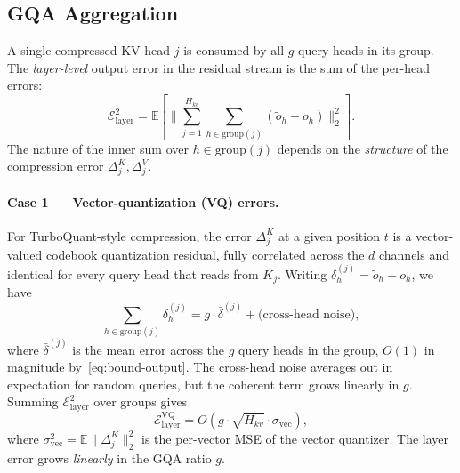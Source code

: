 \subsection{GQA Aggregation}
\label{sec:theory-gqa}

A single compressed KV head $j$ is consumed by all $g$ query heads in its
group. The \emph{layer-level} output error in the residual stream is the sum
of the per-head errors:
\begin{equation}
\label{eq:layer-error}
\mathcal{E}_{\mathrm{layer}}^2 = \mathbb{E}\!\left[ \Big\| \sum_{j=1}^{H_{kv}} \sum_{h \in \mathrm{group}(j)} (\tilde o_h - o_h) \Big\|_2^2 \right].
\end{equation}
The nature of the inner sum over $h \in \mathrm{group}(j)$ depends on the
\emph{structure} of the compression error $\Delta^K_j, \Delta^V_j$.

\paragraph{Case 1 — Vector-quantization (VQ) errors.}
For TurboQuant-style compression, the error $\Delta^K_j$ at a given position
$t$ is a vector-valued codebook quantization residual, fully correlated
across the $d$ channels and identical for every query head that reads from
$K_j$. Writing $\delta_h^{(j)} = \tilde o_h - o_h$, we have
\[
\sum_{h \in \mathrm{group}(j)} \delta_h^{(j)} = g \cdot \bar\delta^{(j)} + \text{(cross-head noise)},
\]
where $\bar\delta^{(j)}$ is the mean error across the $g$ query heads in the
group, $O(1)$ in magnitude by~\eqref{eq:bound-output}. The cross-head noise
averages out in expectation for random queries, but the coherent term grows
linearly in $g$. Summing $\mathcal{E}_{\mathrm{layer}}^2$ over groups gives
\begin{equation}
\label{eq:vq-scaling}
\mathcal{E}_{\mathrm{layer}}^{\mathrm{VQ}} = O\!\left( g \cdot \sqrt{H_{kv}} \cdot \sigma_{\mathrm{vec}} \right),
\end{equation}
where $\sigma_{\mathrm{vec}}^2 = \mathbb{E}\|\Delta^K_j\|_2^2$ is the
per-vector MSE of the vector quantizer. The layer error grows
\emph{linearly} in the GQA ratio $g$.

